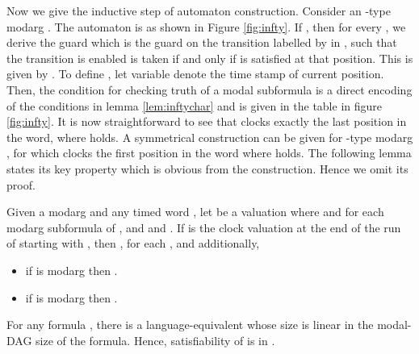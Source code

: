 \documentclass{llncs}
\newcommand{\oomit}[1]{}
\newcommand{\potdta}{\mbox{}}
\newcommand{\mitlfpinf}{\mbox{}}
\newcommand{\np}{\mbox{}}
\begin{document}
Now we give the inductive step of automaton construction. 
Consider an -type modarg . The automaton  is as shown in Figure \ref{fig:infty}. 
If , then for every , we derive the guard  which is the guard on the transition labelled by  in , such that the transition is enabled is taken if and only if  is satisfied at that position. This is given by .
To define , let variable  denote the time stamp of current position. Then, the condition for checking truth of a modal subformula  is a direct encoding of the conditions in lemma \ref{lem:inftychar} and is given in the table in figure \ref{fig:infty}.
 It is now straightforward to see that  clocks exactly the last position in the word, where  holds.  A symmetrical construction can be given for  -type modarg , for which  clocks the first position in the word where  holds.
The following lemma states its key property which is obvious from
the construction. Hence we omit its  proof.
\begin{lemma}\label{lem:infty}
Given a  modarg   and any timed word , let  be a valuation where  and 
 for each modarg subformula  of , and  and . If
 is the clock valuation at the end of the run of  starting with , then
,  for each , and additionally,
\begin{itemize}
\item if  is  modarg then .
\item  if  is  modarg then .
\end{itemize}
\end{lemma}
\oomit{
\begin{proof}
Consider an -type modarg . The automaton  is as shown in figure \ref{fig:infty}. 
If , then for the clock , and , we derive the guard  which is the guard on the transition labelled by  in , and which resets . This is given by .  It is now straightforward to see that  clocks exactly the last position in the word, where  holds. 
\end{proof}
}\begin{theorem}
For any \mitlfpinf\/ formula , there is a language-equivalent \potdta\/  whose size is linear in the modal-DAG size of the formula. Hence, satisfiability of  is in \np.
\end{theorem}
\end{document}
